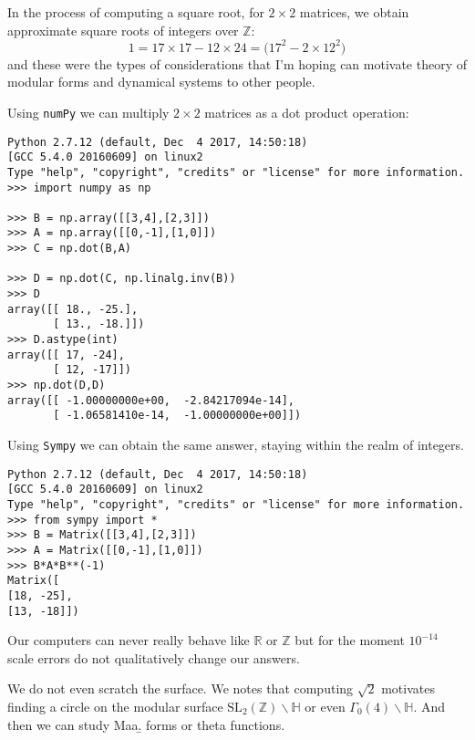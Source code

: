 \documentclass[12pt]{article}
\begin{document}
In the process of computing a square root, for $2 \times 2$ matrices, we obtain approximate square roots of integers over $\mathbb{Z}$:
$$ 1 = 17 \times 17 - 12 \times 24 = \bigg( 17^2 - 2 \times 12^2 \bigg)  $$
and these were the types of considerations that I'm hoping can motivate theory of modular forms and dynamical systems to other people.

\newpage \noindent Using {\tt numPy} we can multiply $2 \times 2$ matrices as a dot product operation:

\begin{verbatim}
Python 2.7.12 (default, Dec  4 2017, 14:50:18) 
[GCC 5.4.0 20160609] on linux2
Type "help", "copyright", "credits" or "license" for more information.
>>> import numpy as np

>>> B = np.array([[3,4],[2,3]])
>>> A = np.array([[0,-1],[1,0]])
>>> C = np.dot(B,A)

>>> D = np.dot(C, np.linalg.inv(B))
>>> D
array([[ 18., -25.],
       [ 13., -18.]])
>>> D.astype(int)
array([[ 17, -24],
       [ 12, -17]])
>>> np.dot(D,D)
array([[ -1.00000000e+00,  -2.84217094e-14],
       [ -1.06581410e-14,  -1.00000000e+00]])

\end{verbatim}
Using {\tt Sympy} we can obtain the same answer, staying within the realm of integers.
\begin{verbatim}
Python 2.7.12 (default, Dec  4 2017, 14:50:18) 
[GCC 5.4.0 20160609] on linux2
Type "help", "copyright", "credits" or "license" for more information.
>>> from sympy import *
>>> B = Matrix([[3,4],[2,3]])
>>> A = Matrix([[0,-1],[1,0]])
>>> B*A*B**(-1)
Matrix([
[18, -25],
[13, -18]])
\end{verbatim}
Our computers can never really behave like $\mathbb{R}$ or $\mathbb{Z}$ but for the moment $10^{-14}$ scale errors do not qualitatively change our answers. 

\newpage \noindent We do not even scratch the surface.  We notes that computing $\sqrt{2}$ motivates finding a circle on the modular surface $\text{SL}_2(\mathbb{Z}) \backslash \mathbb{H}$ or even $ \Gamma_0(4)\backslash \mathbb{H}$.  And then we can study Maa\b. forms or theta functions.
\end{document}
